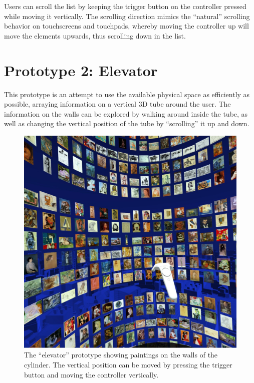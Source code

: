 \documentclass{tufte-book} %
\begin{document}
Users can scroll the list by keeping the trigger button on the controller pressed while moving it vertically. The scrolling direction mimics the ``natural'' scrolling behavior on touchscreens and touchpads, whereby moving the controller up will move the elements upwards, thus scrolling down in the list.


\section{Prototype 2: Elevator}
This prototype is an attempt to use the available physical space as efficiently as possible, arraying information on a vertical 3D tube around the user. The information on the walls can be explored by walking around inside the tube, as well as changing the vertical position of the tube by ``scrolling'' it up and down.

\begin{figure}
  \includegraphics{picassoinside.jpg}
  \caption{The ``elevator'' prototype showing paintings on the walls of the cylinder. The vertical position can be moved by pressing the trigger button and moving the controller vertically.}
  \label{fig:picassoinside}
\end{figure}
\end{document}
